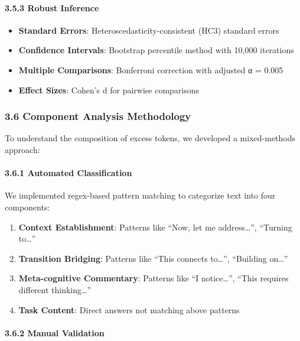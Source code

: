 \documentclass[
  11pt]{article}
\providecommand{\tightlist}{%
  \setlength{\itemsep}{0pt}\setlength{\parskip}{0pt}}
\begin{document}
\paragraph{3.5.3 Robust Inference}\label{robust-inference}

\begin{itemize}
\tightlist
\item
  \textbf{Standard Errors}: Heteroscedasticity-consistent (HC3) standard
  errors
\item
  \textbf{Confidence Intervals}: Bootstrap percentile method with 10,000
  iterations
\item
  \textbf{Multiple Comparisons}: Bonferroni correction with adjusted α =
  0.005
\item
  \textbf{Effect Sizes}: Cohen's d for pairwise comparisons
\end{itemize}

\subsubsection{3.6 Component Analysis
Methodology}\label{component-analysis-methodology}

To understand the composition of excess tokens, we developed a
mixed-methods approach:

\paragraph{3.6.1 Automated
Classification}\label{automated-classification}

We implemented regex-based pattern matching to categorize text into four
components:

\begin{enumerate}
\def\labelenumi{\arabic{enumi}.}
\tightlist
\item
  \textbf{Context Establishment}: Patterns like ``Now, let me
  address\ldots{}'', ``Turning to\ldots{}''
\item
  \textbf{Transition Bridging}: Patterns like ``This connects
  to\ldots{}'', ``Building on\ldots{}''
\item
  \textbf{Meta-cognitive Commentary}: Patterns like ``I
  notice\ldots{}'', ``This requires different thinking\ldots{}''
\item
  \textbf{Task Content}: Direct answers not matching above patterns
\end{enumerate}

\paragraph{3.6.2 Manual Validation}\label{manual-validation}
\end{document}
